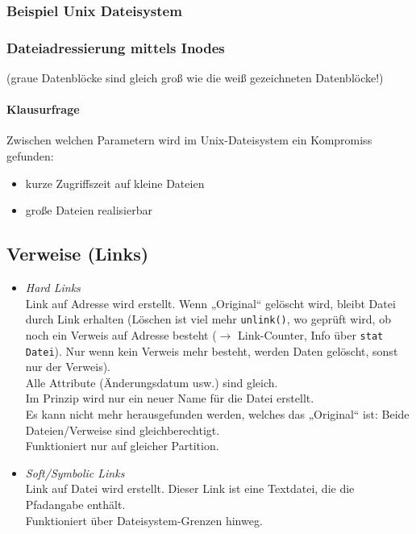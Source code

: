 \subsubsection{Beispiel Unix Dateisystem}
\subsubsection*{Dateiadressierung mittels Inodes}
(graue Datenblöcke sind gleich groß wie die weiß gezeichneten Datenblöcke!)
\paragraph{Klausurfrage} Zwischen welchen Parametern wird im Unix-Dateisystem ein Kompromiss gefunden:
\begin{itemize}
\item kurze Zugriffszeit auf kleine Dateien
\item große Dateien realisierbar
\end{itemize}

\subsection{Verweise (Links)}
\begin{itemize}
\item \emph{Hard Links}\\
Link auf Adresse wird erstellt. Wenn „Original“ gelöscht wird, bleibt Datei durch Link erhalten (Löschen ist viel mehr \lstinline`unlink()`, wo geprüft wird, ob noch ein Verweis auf Adresse besteht ($\to$ Link-Counter, Info über \lstinline`stat Datei`). Nur wenn kein Verweis mehr besteht, werden Daten gelöscht, sonst nur der Verweis).\\
Alle Attribute (Änderungsdatum usw.) sind gleich.\\
Im Prinzip wird nur ein neuer Name für die Datei erstellt.\\
Es kann nicht mehr herausgefunden werden, welches das „Original“ ist: Beide Dateien/Verweise sind gleichberechtigt.\\
Funktioniert nur auf gleicher Partition.
\item \emph{Soft/Symbolic Links}\\
Link auf Datei wird erstellt. Dieser Link ist eine Textdatei, die die Pfadangabe enthält.\\
Funktioniert über Dateisystem-Grenzen hinweg.
\end{itemize}

